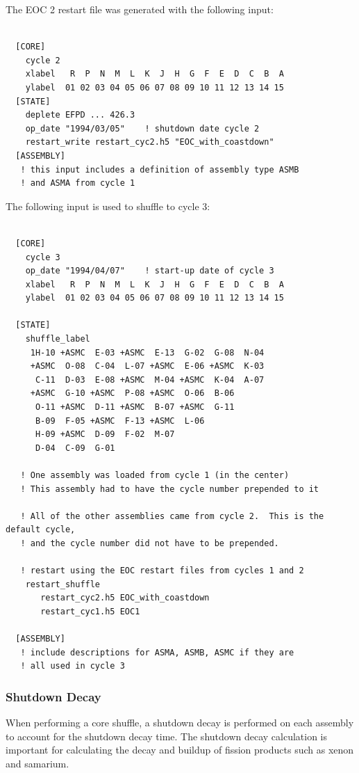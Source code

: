 The EOC 2 restart file was generated with the following input:
\begin{Verbatim}[fontsize=\small]

  [CORE]
    cycle 2
    xlabel   R  P  N  M  L  K  J  H  G  F  E  D  C  B  A
    ylabel  01 02 03 04 05 06 07 08 09 10 11 12 13 14 15
  [STATE]
    deplete EFPD ... 426.3
    op_date "1994/03/05"    ! shutdown date cycle 2
    restart_write restart_cyc2.h5 "EOC_with_coastdown"
  [ASSEMBLY]
   ! this input includes a definition of assembly type ASMB
   ! and ASMA from cycle 1

\end{Verbatim}

The following input is used to shuffle to cycle 3:
\begin{Verbatim}[fontsize=\small]

  [CORE]
    cycle 3
    op_date "1994/04/07"    ! start-up date of cycle 3
    xlabel   R  P  N  M  L  K  J  H  G  F  E  D  C  B  A
    ylabel  01 02 03 04 05 06 07 08 09 10 11 12 13 14 15

  [STATE]
    shuffle_label
     1H-10 +ASMC  E-03 +ASMC  E-13  G-02  G-08  N-04
     +ASMC  O-08  C-04  L-07 +ASMC  E-06 +ASMC  K-03
      C-11  D-03  E-08 +ASMC  M-04 +ASMC  K-04  A-07
     +ASMC  G-10 +ASMC  P-08 +ASMC  O-06  B-06
      O-11 +ASMC  D-11 +ASMC  B-07 +ASMC  G-11
      B-09  F-05 +ASMC  F-13 +ASMC  L-06
      H-09 +ASMC  D-09  F-02  M-07
      D-04  C-09  G-01

   ! One assembly was loaded from cycle 1 (in the center)
   ! This assembly had to have the cycle number prepended to it

   ! All of the other assemblies came from cycle 2.  This is the default cycle,
   ! and the cycle number did not have to be prepended.

   ! restart using the EOC restart files from cycles 1 and 2
    restart_shuffle
       restart_cyc2.h5 EOC_with_coastdown
       restart_cyc1.h5 EOC1

  [ASSEMBLY]
   ! include descriptions for ASMA, ASMB, ASMC if they are
   ! all used in cycle 3

\end{Verbatim}

\subsubsection{Shutdown Decay}
When performing a core shuffle, a shutdown decay is performed on each assembly to account for
the shutdown decay time. The shutdown decay calculation is important for calculating the decay and
buildup of fission products such as xenon and samarium.

